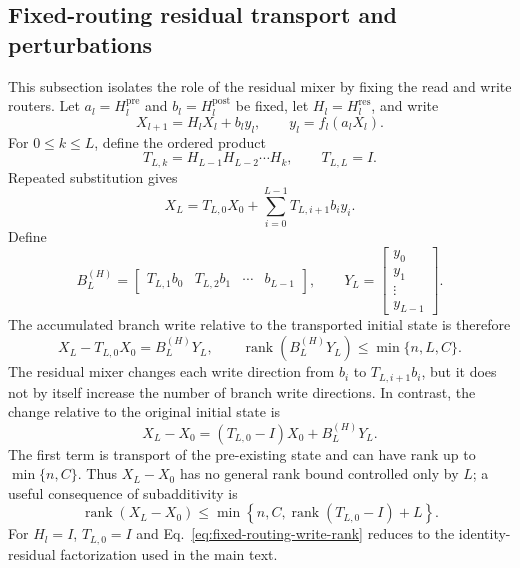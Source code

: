 \documentclass{article}
\newcommand{\Hpre}{H^{\mathrm{pre}}}
\newcommand{\Hpost}{H^{\mathrm{post}}}
\newcommand{\Hres}{H^{\mathrm{res}}}
\begin{document}
\subsection{Fixed-routing residual transport and perturbations}
\label{app:fixed-routing-residual}
This subsection isolates the role of the residual mixer by fixing the read and
write routers.  Let $a_l=\Hpre_l$ and $b_l=\Hpost_l$ be fixed, let
$H_l=\Hres_l$, and write
\begin{equation}
 X_{l+1}=H_lX_l+b_ly_l,\mspace{36mu} y_l=f_l(a_lX_l).
 \label{eq:fixed-routing-update}
\end{equation}
For $0\leq k\leq L$, define the ordered product
\begin{equation}
 T_{L,k}=H_{L-1}H_{L-2}\cdots H_k,\mspace{36mu} T_{L,L}=I.
 \label{eq:fixed-routing-product}
\end{equation}
Repeated substitution gives
\begin{equation}
 X_L=T_{L,0}X_0+\sum_{i=0}^{L-1}T_{L,i+1}b_i y_i.
 \label{eq:fixed-routing-expansion}
\end{equation}
Define
\begin{equation}
 B_L^{(H)}=\begin{bmatrix}T_{L,1}b_0&T_{L,2}b_1&\cdots&b_{L-1}\end{bmatrix},\mspace{36mu}
 Y_L=\begin{bmatrix}y_0\\y_1\\\vdots\\y_{L-1}\end{bmatrix}.
 \label{eq:fixed-routing-by}
\end{equation}
The accumulated branch write relative to the transported initial state is
therefore
\begin{equation}
 X_L-T_{L,0}X_0=B_L^{(H)}Y_L,\mspace{36mu}
 \operatorname{rank}(B_L^{(H)}Y_L)\leq\min\{n,L,C\}.
 \label{eq:fixed-routing-write-rank}
\end{equation}
The residual mixer changes each write direction from $b_i$ to
$T_{L,i+1}b_i$, but it does not by itself increase the number of branch
write directions.  In contrast, the change relative to the original initial
state is
\begin{equation}
 X_L-X_0=(T_{L,0}-I)X_0+B_L^{(H)}Y_L.
 \label{eq:fixed-routing-total-change}
\end{equation}
The first term is transport of the pre-existing state and can have rank up to
$\min\{n,C\}$.  Thus $X_L-X_0$ has no general rank bound controlled only
by $L$; a useful consequence of subadditivity is
\begin{equation}
 \operatorname{rank}(X_L-X_0)\leq
 \min\left\{n,C,\operatorname{rank}(T_{L,0}-I)+L\right\}.
 \label{eq:fixed-routing-total-rank}
\end{equation}
For $H_l=I$, $T_{L,0}=I$ and Eq.~\ref{eq:fixed-routing-write-rank}
reduces to the identity-residual factorization used in the main text.
\end{document}
